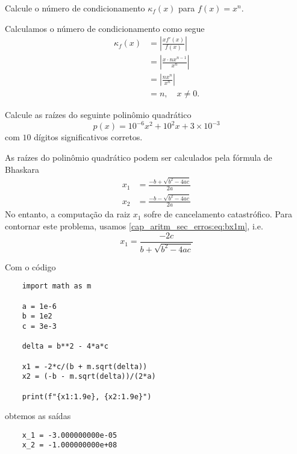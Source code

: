 \begin{exeresol}
  Calcule o número de condicionamento $\kappa_f(x)$ para $f(x) = x^n$.
\end{exeresol}
\begin{resol}
  Calculamos o número de condicionamento como segue
  \begin{align}
    \kappa_f(x) &= \left|\frac{xf'(x)}{f(x)}\right|\\
                &= \left|\frac{x\cdot nx^{n-1}}{x^n}\right|\\
                &= \left|\frac{nx^n}{x^n}\right|\\
                &= n,\quad x\neq 0.
  \end{align}
\end{resol}

\begin{exeresol}
  Calcule as raízes do seguinte polinômio quadrático
  \begin{equation}
    p(x) = 10^{-6}x^2 + 10^2x + 3\times 10^{-3}
  \end{equation}
  com $10$ dígitos significativos corretos.
\end{exeresol}
\begin{resol}
  As raízes do polinômio quadrático podem ser calculados pela fórmula de Bhaskara
  \begin{align}
    x_1 &= \frac{-b + \sqrt{b^2 - 4ac}}{2a}\label{cap_aritm_sec_erros:eq:bx1}\\
    x_2 &= \frac{-b - \sqrt{b^2 - 4ac}}{2a}
  \end{align}
  No entanto, a computação da raiz $x_1$ sofre de cancelamento catastrófico. Para contornar este problema, usamos \eqref{cap_aritm_sec_erros:eq:bx1m}, i.e.
  \begin{equation}
    x_1 = \frac{-2c}{b + \sqrt{b^2 - 4ac}}
  \end{equation}

  
  Com o código
  \begin{lstlisting}
    import math as m

    a = 1e-6
    b = 1e2
    c = 3e-3

    delta = b**2 - 4*a*c

    x1 = -2*c/(b + m.sqrt(delta))
    x2 = (-b - m.sqrt(delta))/(2*a)

    print(f"{x1:1.9e}, {x2:1.9e}")
  \end{lstlisting}
  obtemos as saídas
  \begin{lstlisting}
    x_1 = -3.000000000e-05
    x_2 = -1.000000000e+08
  \end{lstlisting}
  
\end{resol}

